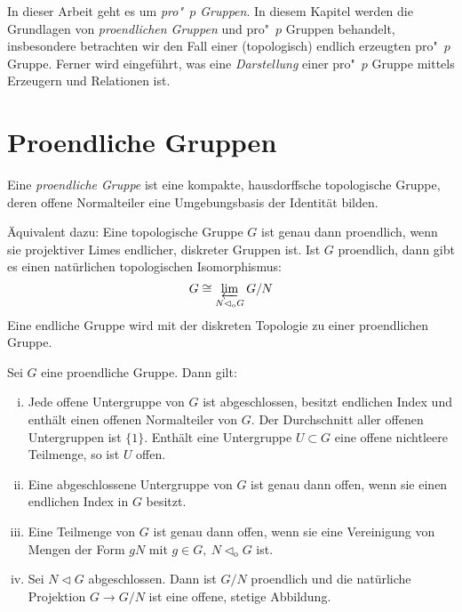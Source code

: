 \documentclass[11pt,a4paper,openany]{memoir}
\begin{document}
In dieser Arbeit geht es um \textit{pro"~$p$ Gruppen}. In diesem Kapitel werden die Grundlagen von \textit{proendlichen Gruppen} und pro"~$p$ Gruppen behandelt, insbesondere betrachten wir den Fall einer (topologisch) endlich erzeugten pro"~$p$ Gruppe. Ferner wird eingeführt, was eine \textit{Darstellung} einer pro"~$p$ Gruppe mittels Erzeugern und Relationen ist.

\section{Proendliche Gruppen}

\begin{definition}
Eine \textit{proendliche Gruppe} ist eine kompakte, hausdorffsche topologische Gruppe, deren offene Normalteiler eine Umgebungsbasis der Identität bilden.
\end{definition}

\begin{remark}
Äquivalent dazu: Eine topologische Gruppe $G$ ist genau dann proendlich, wenn sie projektiver Limes endlicher, diskreter Gruppen ist. Ist $G$ proendlich, dann gibt es einen natürlichen topologischen Isomorphismus:
\[G\cong\varprojlim_{N\lhd_\text{o}G}G/N \]
Eine endliche Gruppe wird mit der diskreten Topologie zu einer proendlichen Gruppe.
\end{remark}

\iffalse
\begin{proposition}\label{1.2.i}
Sei $G$ eine proendliche Gruppe. Dann gilt:
\begin{enumerate}[(i)]
\item Jede offene Untergruppe von $G$ ist abgeschlossen, besitzt endlichen Index und enthält einen offenen Normalteiler von $G$. Der Durchschnitt aller offenen Untergruppen ist $\{1\}$. Enthält eine Untergruppe $U\subset G$ eine offene nichtleere Teilmenge, so ist $U$ offen.
\item Eine abgeschlossene Untergruppe von $G$ ist genau dann offen, wenn sie einen endlichen Index in $G$ besitzt.
\item Eine Teilmenge von $G$ ist genau dann offen, wenn sie eine Vereinigung von Mengen der Form $gN$ mit $g\in G,\ N\lhd_\text{o} G$ ist.
\item Sei $N\lhd G$ abgeschlossen. Dann ist $G/N$ proendlich und die natürliche Projektion $G\to G/N$ ist eine offene, stetige Abbildung.
\end{enumerate}
\end{proposition}
\end{document}
